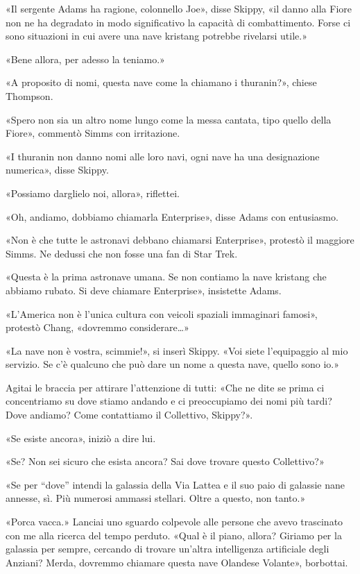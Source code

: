 «Il sergente Adams ha ragione, colonnello Joe», disse Skippy, «il danno
alla Fiore non ne ha degradato in modo significativo la capacità di
combattimento. Forse ci sono situazioni in cui avere una nave kristang
potrebbe rivelarsi utile.»

«Bene allora, per adesso la teniamo.»

«A proposito di nomi, questa nave come la chiamano i thuranin?», chiese
Thompson.

«Spero non sia un altro nome lungo come la messa cantata, tipo quello
della Fiore», commentò Simms con irritazione.

«I thuranin non danno nomi alle loro navi, ogni nave ha una designazione
numerica», disse Skippy.

«Possiamo darglielo noi, allora», riflettei.

«Oh, andiamo, dobbiamo chiamarla Enterprise», disse Adams con
entusiasmo.

«Non è che tutte le astronavi debbano chiamarsi Enterprise», protestò il
maggiore Simms. Ne dedussi che non fosse una fan di Star Trek.

«Questa è la prima astronave umana. Se non contiamo la nave kristang che
abbiamo rubato. Si deve chiamare Enterprise», insistette Adams.

«L'America non è l'unica cultura con veicoli spaziali immaginari
famosi», protestò Chang, «dovremmo considerare\ldots»

«La nave non è vostra, scimmie!», si inserì Skippy. «Voi siete
l'equipaggio al mio servizio. Se c'è qualcuno che può dare un nome a
questa nave, quello sono io.»

Agitai le braccia per attirare l'attenzione di tutti: «Che ne dite se
prima ci concentriamo su dove stiamo andando e ci preoccupiamo dei nomi
più tardi? Dove andiamo? Come contattiamo il Collettivo, Skippy?».

«Se esiste ancora», iniziò a dire lui.

«Se? Non sei sicuro che esista ancora? Sai dove trovare questo
Collettivo?»

«Se per ``dove'' intendi la galassia della Via Lattea e il suo paio di
galassie nane annesse, sì. Più numerosi ammassi stellari. Oltre a
questo, non tanto.»

«Porca vacca.» Lanciai uno sguardo colpevole alle persone che avevo
trascinato con me alla ricerca del tempo perduto. «Qual è il piano,
allora? Giriamo per la galassia per sempre, cercando di trovare un'altra
intelligenza artificiale degli Anziani? Merda, dovremmo chiamare questa
nave Olandese Volante», borbottai.

